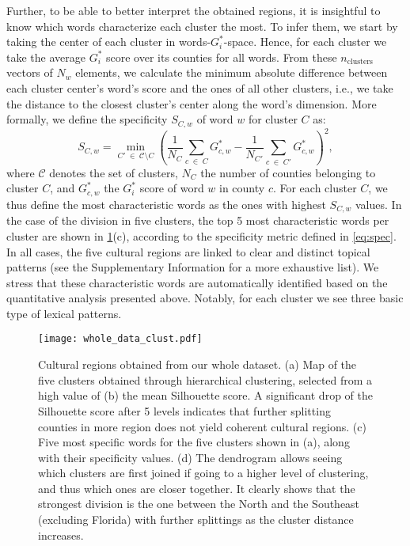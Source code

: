 \documentclass[../thesis.tex]{subfiles}
\begin{document}
Further, to be able to better interpret the obtained regions, it is insightful to know
which words characterize each cluster the most. To infer them, we start by taking the
center of each cluster in words-$G_i^*$-space. Hence, for each cluster we take the
average $G_i^*$ score over its counties for all words. From these $n_{\text{clusters}}$
vectors of $N_w$ elements, we calculate the minimum absolute difference between each
cluster center's word's score and the ones of all other clusters, i.e., we take the
distance to the closest cluster's center along the word's dimension. More formally, we
define the specificity $S_{C, w}$ of word $w$ for cluster $C$ as:
\begin{equation}
\label{eq:spec}
  S_{C, w} = \min_{C' \; \in \; \mathcal{C} \setminus C} \left(
  \frac{1}{N_C} \sum_{c \; \in \; C} G_{c, w}^*
    - \frac{1}{N_{C'}} \sum_{c \; \in \; C'} G_{c, w}^*
  \right)^2 ,
\end{equation}
where $\mathcal{C}$ denotes the set of clusters, $N_C$ the number of counties belonging
to cluster $C$, and $G_{c, w}^*$ the $G_i^*$ score of word $w$ in county $c$. For each
cluster $C$, we thus define the most characteristic words as the ones with highest
$S_{C, w}$ values. In the case of the division in five clusters, the top 5 most
characteristic words per cluster are shown in \cref{fig:whole_data_clust}(c), according
to the specificity metric defined in \cref{eq:spec}. In all cases, the five cultural
regions are linked to clear and distinct topical patterns (see the Supplementary
Information for a more exhaustive list). We stress that these characteristic words are
automatically identified based on the quantitative analysis presented above. Notably,
for each cluster we see three basic type of lexical patterns. 

\begin{figure}[ht!]
\centering
  \texttt{[image: whole\_data\_clust.pdf]}
  \caption{Cultural regions obtained from our whole dataset. (a) Map of the five
  clusters obtained through hierarchical clustering, selected from a high value of (b)
  the mean Silhouette score. A significant drop of the Silhouette score after 5 levels
  indicates that further splitting counties in more region does not yield coherent
  cultural regions. (c) Five most specific words for the five clusters shown in (a),
  along with their specificity values. (d) The dendrogram allows seeing which clusters
  are first joined if going to a higher level of clustering, and thus which ones are
  closer together. It clearly shows that the strongest division is the one between the
  North and the Southeast (excluding Florida) with further splittings as the cluster
  distance increases.}
  \label{fig:whole_data_clust}
\end{figure}  
\end{document}

